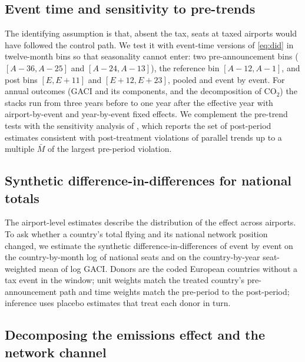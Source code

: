 \subsection{Event time and sensitivity to pre-trends}

The identifying assumption is that, absent the tax, seats at taxed airports would have followed the
control path. We test it with event-time versions of \eqref{eq:did} in twelve-month bins so that
seasonality cannot enter: two pre-announcement bins ($[A{-}36, A{-}25]$ and $[A{-}24, A{-}13]$),
the reference bin $[A{-}12, A{-}1]$, and post bins $[E, E{+}11]$ and $[E{+}12, E{+}23]$, pooled and event by
event. For annual outcomes (GACI and its components, and the decomposition of CO$_2$) the stacks run
from three years before to one year after the effective year with airport-by-event and year-by-event
fixed effects. We complement the pre-trend tests with the sensitivity analysis of \citet{rambachan2023},
which reports the set of post-period estimates consistent with post-treatment violations of parallel
trends up to a multiple $\bar M$ of the largest pre-period violation.

\subsection{Synthetic difference-in-differences for national totals}

The airport-level estimates describe the distribution of the effect across airports. To ask whether a
country's total flying and its national network position changed, we estimate the synthetic
difference-in-differences of \citet{arkhangelsky2021} event by event on the country-by-month log of
national seats and on the country-by-year seat-weighted mean of log GACI. Donors are the coded European
countries without a tax event in the window; unit weights match the treated country's pre-announcement
path and time weights match the pre-period to the post-period; inference uses placebo estimates that
treat each donor in turn.

\subsection{Decomposing the emissions effect and the network channel}

